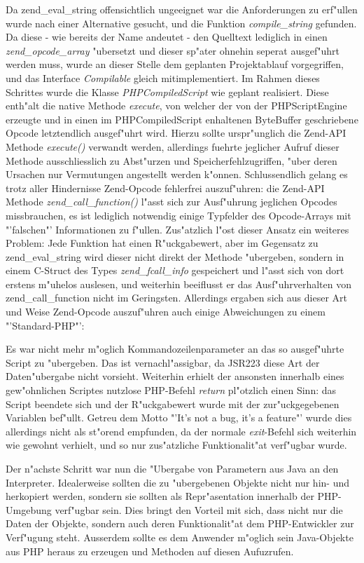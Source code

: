 Da zend\_eval\_string offensichtlich ungeeignet war die Anforderungen zu erf"ullen wurde nach einer Alternative gesucht, und
die Funktion \emph{compile\_string} gefunden. Da diese - wie bereits der Name andeutet - den Quelltext lediglich in einen
\emph{zend\_opcode\_array} "ubersetzt und dieser sp"ater ohnehin seperat ausgef"uhrt werden muss, wurde an dieser Stelle dem
geplanten Projektablauf vorgegriffen, und das Interface \emph{Compilable} gleich mitimplementiert. Im Rahmen dieses Schrittes
wurde die Klasse \emph{PHPCompiledScript} wie geplant realisiert. Diese enth"alt die native Methode \emph{execute}, von welcher
der von der PHPScriptEngine erzeugte und in einen im PHPCompiledScript enhaltenen ByteBuffer geschriebene Opcode letztendlich
ausgef"uhrt wird. Hierzu sollte urspr"unglich die Zend-API Methode \emph{execute()} verwandt werden, allerdings fuehrte jeglicher
Aufruf dieser Methode ausschliesslich zu Abst"urzen und Speicherfehlzugriffen, "uber deren Ursachen nur Vermutungen angestellt
werden k"onnen. Schlussendlich gelang es trotz aller Hindernisse Zend-Opcode fehlerfrei auszuf"uhren: die Zend-API Methode
\emph{zend\_call\_function()} l"asst sich zur Ausf"uhrung jeglichen Opcodes missbrauchen, es ist lediglich notwendig einige
Typfelder des Opcode-Arrays mit "'falschen"' Informationen zu f"ullen. Zus"atzlich l"ost dieser Ansatz ein weiteres Problem:
Jede Funktion hat einen R"uckgabewert, aber im Gegensatz zu zend\_eval\_string wird dieser nicht direkt der Methode "ubergeben,
sondern in einem C-Struct des Types \emph{zend\_fcall\_info} gespeichert und l"asst sich von dort erstens m"uhelos auslesen, und
weiterhin beeiflusst er das Ausf"uhrverhalten von zend\_call\_function nicht im Geringsten. Allerdings ergaben sich aus dieser 
Art und Weise Zend-Opcode auszuf"uhren auch einige Abweichungen zu einem "'Standard-PHP"':

Es war nicht mehr m"oglich Kommandozeilenparameter an das so ausgef"uhrte Script zu "ubergeben. Das ist vernachl"assigbar, da
JSR223 diese Art der Daten"ubergabe nicht vorsieht. Weiterhin erhielt der ansonsten innerhalb eines gew"ohnlichen Scriptes nutzlose
PHP-Befehl \emph{return} pl"otzlich einen Sinn: das Script beendete sich und der R"uckgabewert wurde mit der zur"uckgegebenen
Variablen bef"ullt. Getreu dem Motto "'It's not a bug, it's a feature"' wurde dies allerdings nicht als st"orend empfunden, da
der normale \emph{exit}-Befehl sich weiterhin wie gewohnt verhielt, und so nur zus"atzliche Funktionalit"at verf"ugbar wurde.

Der n"achste Schritt war nun die "Ubergabe von Parametern aus Java an den Interpreter. Idealerweise sollten die zu "ubergebenen
Objekte nicht nur hin- und herkopiert werden, sondern sie sollten als Repr"asentation innerhalb der PHP-Umgebung verf"ugbar sein.
Dies bringt den Vorteil mit sich, dass nicht nur die Daten der Objekte, sondern auch deren Funktionalit"at dem PHP-Entwickler zur
Verf"ugung steht. Ausserdem sollte es dem Anwender m"oglich sein Java-Objekte aus PHP heraus zu erzeugen und Methoden auf diesen
Aufuzrufen.

